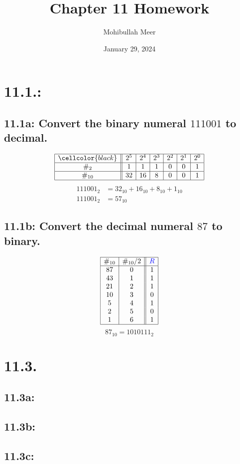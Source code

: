\documentclass{article}
\title{Chapter 11 Homework}
\author{Mohibullah Meer}
\date{January 29, 2024}
\begin{document}
\maketitle
\section*{11.1.:}
\subsection*{11.1a: Convert the binary numeral $111001$ to decimal.}
\[\begin{array}{|c||c|c|c|c|c|c|}
\hline
\cellcolor{black}&2^5&2^4&2^3&2^2&2^1&2^0\\
\hline
\#_2&1&1&1&0&0&1\\
\hline
\#_{10}&32&16&8&0&0&1\\
\hline
\end{array}\]
\begin{align*}
  111001_2&=32_{10}+16_{10}+8_{10}+1_{10}\\
  111001_2&=57_{10}
\end{align*}
\subsection*{11.1b: Convert the decimal numeral $87$ to binary.}
\[\begin{array}{|c|c||c|}
\hline
\#_{10}&\#_{10}/2&\textcolor{blue}{R}\\
\hline
87&0&1\\
43&1&1\\
21&2&1\\
10&3&0\\
5&4&1\\
2&5&0\\
1&6&1\\
\hline
\end{array}\]
\[87_{10}=1010111_2\]
\section*{11.3.}
\subsection*{11.3a:}
\subsection*{11.3b:}
\subsection*{11.3c:}
\end{document}
